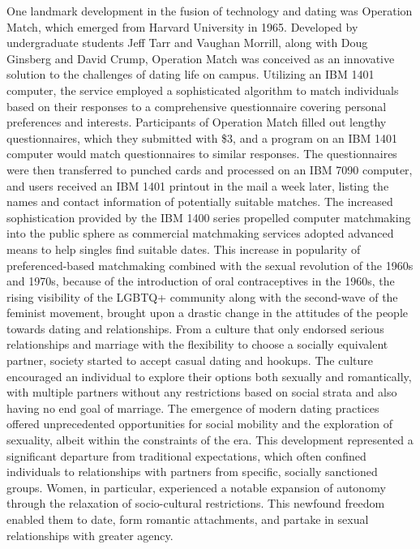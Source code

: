 One landmark development in the fusion of technology and dating was Operation Match, which emerged from Harvard University in 1965. Developed by undergraduate students Jeff Tarr and Vaughan Morrill, along with Doug Ginsberg and David Crump, Operation Match was conceived as an innovative solution to the challenges of dating life on campus. Utilizing an IBM 1401 computer, the service employed a sophisticated algorithm to match individuals based on their responses to a comprehensive questionnaire covering personal preferences and interests.\cite{noauthor_operation_1965}  Participants of Operation Match filled out lengthy questionnaires, which they submitted with \$3, and a program on an IBM 1401 computer would match questionnaires to similar responses.\cite{valley_new_2015}  The questionnaires were then transferred to punched cards and processed on an IBM 7090 computer, and users received an IBM 1401 printout in the mail a week later, listing the names and contact information of potentially suitable matches. The increased sophistication provided by the IBM 1400 series propelled computer matchmaking into the public sphere as commercial matchmaking services adopted advanced means to help singles find suitable dates. This increase in popularity of preferenced-based matchmaking combined with the sexual revolution of the 1960s and 1970s, because of the introduction of oral contraceptives in the 1960s, the rising visibility of the LGBTQ+ community along with the second-wave of the feminist movement,\cite{book:1309549} brought upon a drastic change in the attitudes of the people towards dating and relationships. From a culture that only endorsed serious relationships and marriage with the flexibility to choose a socially equivalent partner, society started to accept casual dating and hookups. The culture encouraged an individual to explore their options both sexually and romantically, with multiple partners without any restrictions based on social strata and also having no end goal of marriage. The emergence of modern dating practices offered unprecedented opportunities for social mobility and the exploration of sexuality, albeit within the constraints of the era. This development represented a significant departure from traditional expectations, which often confined individuals to relationships with partners from specific, socially sanctioned groups. Women, in particular, experienced a notable expansion of autonomy through the relaxation of socio-cultural restrictions\cite{book:1309549}. This newfound freedom enabled them to date, form romantic attachments, and partake in sexual relationships with greater agency. 

